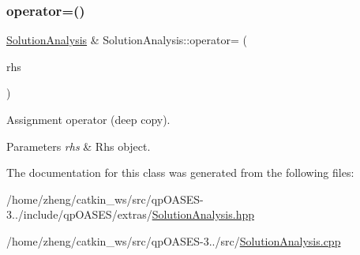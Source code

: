 \subsubsection{\texorpdfstring{operator=()}{operator=()}}
{\footnotesize\ttfamily \hyperlink{class_solution_analysis}{Solution\+Analysis} \& Solution\+Analysis\+::operator= (\begin{DoxyParamCaption}\item[{const \hyperlink{class_solution_analysis}{Solution\+Analysis} \&}]{rhs }\end{DoxyParamCaption})}

Assignment operator (deep copy). 
\begin{DoxyParams}{Parameters}
{\em rhs} & Rhs object. \\
\hline
\end{DoxyParams}


The documentation for this class was generated from the following files\+:\begin{DoxyCompactItemize}
\item 
/home/zheng/catkin\+\_\+ws/src/qp\+O\+A\+S\+E\+S-\/3../include/qp\+O\+A\+S\+E\+S/extras/\hyperlink{_solution_analysis_8hpp}{Solution\+Analysis.\+hpp}\item 
/home/zheng/catkin\+\_\+ws/src/qp\+O\+A\+S\+E\+S-\/3../src/\hyperlink{_solution_analysis_8cpp}{Solution\+Analysis.\+cpp}\end{DoxyCompactItemize}
